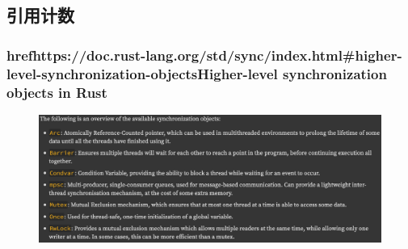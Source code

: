 \subsection{引用计数} %
\begin{frame}[fragile]
    \frametitle{href{https://doc.rust-lang.org/std/sync/index.html#higher-level-synchronization-objects}{Higher-level synchronization objects in Rust}}
    \begin{figure}
    \includegraphics[width=0.8\linewidth]{figs/sync-obj.png}
    \end{figure}

\end{frame}
% 
% 
% 
% 
% 
% 
% 
% 
% 
% 
% 
% 
